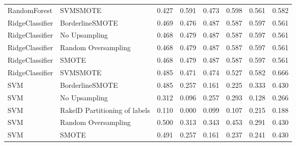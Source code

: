\begin{tabular}{llllllll}
                   RandomForest &                      SVMSMOTE & 0.427 &                     0.591 &                 0.473 &                  0.598 &                                   0.561 &     0.582 \\
                RidgeClassifier &               BorderlineSMOTE & 0.469 &                     0.476 &                 0.487 &                  0.587 &                                   0.597 &     0.561 \\
                RidgeClassifier &                 No Upsampling & 0.468 &                     0.479 &                 0.487 &                  0.587 &                                   0.597 &     0.561 \\
                RidgeClassifier &           Random Oversampling & 0.468 &                     0.479 &                 0.487 &                  0.587 &                                   0.597 &     0.561 \\
                RidgeClassifier &                         SMOTE & 0.468 &                     0.479 &                 0.487 &                  0.587 &                                   0.597 &     0.561 \\
                RidgeClassifier &                      SVMSMOTE & 0.485 &                     0.471 &                 0.474 &                  0.527 &                                   0.582 &     0.666 \\
                            SVM &               BorderlineSMOTE & 0.485 &                     0.257 &                 0.161 &                  0.225 &                                   0.333 &     0.430 \\
                            SVM &                 No Upsampling & 0.312 &                     0.096 &                 0.257 &                  0.293 &                                   0.128 &     0.266 \\
                            SVM & RakelD Partitioning of labels & 0.110 &                     0.000 &                 0.099 &                  0.107 &                                   0.215 &     0.188 \\
                            SVM &           Random Oversampling & 0.500 &                     0.313 &                 0.343 &                  0.453 &                                   0.291 &     0.430 \\
                            SVM &                         SMOTE & 0.491 &                     0.257 &                 0.161 &                  0.237 &                                   0.241 &     0.430 \\

\end{tabular}
